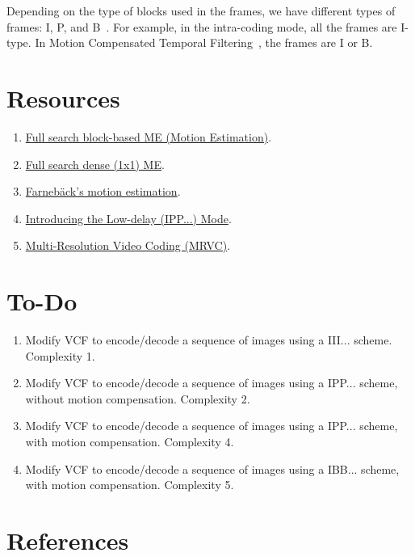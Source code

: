 Depending on the type of blocks used in the frames, we have different
types of frames: I, P, and B~\cite{vruiz__MC}. For example, in the
intra-coding mode, all the frames are I-type. In Motion Compensated
Temporal Filtering~\cite{vruiz__MCTF}, the frames are I or B.

\section{Resources}
\begin{enumerate}
\item \href{https://github.com/vicente-gonzalez-ruiz/motion_estimation/blob/main/src/motion_estimation/full_search_block_ME.ipynb}{Full search block-based ME (Motion Estimation)}.
\item \href{https://github.com/vicente-gonzalez-ruiz/motion_estimation/blob/main/src/motion_estimation/full_search_dense_ME.ipynb}{Full search dense (1x1) ME}.
\item \href{https://github.com/vicente-gonzalez-ruiz/motion_estimation/blob/main/src/motion_estimation/farneback_ME.ipynb}{Farnebäck's motion estimation}.
\item \href{https://github.com/vicente-gonzalez-ruiz/motion_compensation/blob/master/introducing_IPPP.ipynb}{Introducing the Low-delay (IPP...) Mode}.
\item \href{https://github.com/Sistemas-Multimedia/MRVC}{Multi-Resolution Video Coding (MRVC)}.
\end{enumerate}

\section{To-Do}

\begin{enumerate}
\item Modify VCF to encode/decode a sequence of images using a
  III... scheme. Complexity 1.
\item Modify VCF to encode/decode a sequence of images using a
  IPP... scheme, without motion compensation. Complexity 2.
\item Modify VCF to encode/decode a sequence of images using a
  IPP... scheme, with motion compensation. Complexity 4.
\item Modify VCF to encode/decode a sequence of images using a
  IBB... scheme, with motion compensation. Complexity 5.
\end{enumerate}

  
\section{References}

\renewcommand{\addcontentsline}[3]{}%


